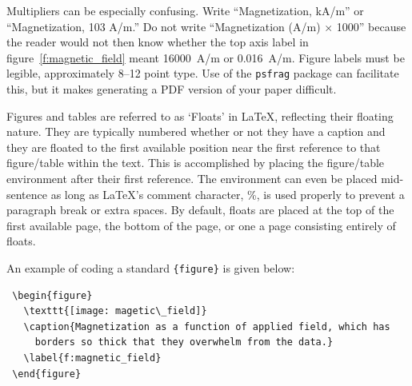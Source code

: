 \documentclass{aiaa-tc}%
\newcommand{\pkg}[1]{\texttt{#1}}
\begin{document}
Multipliers can be especially confusing.
Write ``Magnetization, kA/m'' or ``Magnetization, 103 A/m.''
Do not write ``Magnetization (A/m) $\times$ 1000'' because the reader
would not then know whether the top axis label in
figure~\ref{f:magnetic_field} meant 16000~A/m or 0.016~A/m.
Figure labels must be legible, approximately 8--12 point type.
Use of the \pkg{psfrag} package can facilitate this, but it makes
generating a PDF version of your paper difficult.

Figures and tables are referred to as `Floats' in \LaTeX, reflecting
their floating nature.
They are typically numbered whether or not they have a caption and they
are floated to the first available position near the first reference to
that figure/table within the text.
This is accomplished by placing the figure/table environment after
their first reference.
The environment can even be placed mid-sentence as long as \LaTeX's
comment character, \%, is used properly to prevent a paragraph break or
extra spaces.
By default, floats are placed at the top of the first available page,
the bottom of the page, or one a page consisting entirely of floats.

An example of coding a standard \verb|{figure}| is given below:
\begin{Verbatim}
 \begin{figure}
   \texttt{[image: magetic\_field]}
   \caption{Magnetization as a function of applied field, which has
     borders so thick that they overwhelm from the data.}
   \label{f:magnetic_field}
 \end{figure}
\end{Verbatim}
\end{document}
